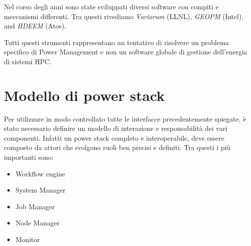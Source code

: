Nel corso degli anni sono state sviluppati diversi software con compiti e meccanismi differenti. Tra questi rivediamo  \emph{Variorum} (LLNL), \emph{GEOPM} (Intel)\cite{GEOPM}, and \emph{HDEEM} (Atos)\cite{HDEEM}. 

Tutti questi strumenti rappresentano un tentativo di risolvere un problema specifico di Power Management e non un software globale di gestione dell'energia di sistemi HPC.


\section{Modello di power stack} %
Per utilizzare in modo controllato tutte le interfacce precedentemente spiegate, è stato necessario definire un modello di interazione e responsabilità dei vari componenti. Infatti un power stack completo e interoperabile, deve essere composto da attori che svolgono ruoli ben precisi e definiti. Tra questi i più importanti sono:
\begin{itemize}
    \item Workflow engine
    \item System Manager
    \item Job Manager
    \item Node Manager
    \item Monitor
\end{itemize}

